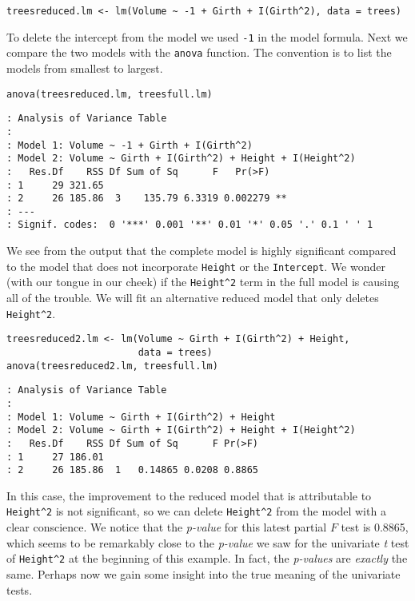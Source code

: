 \begin{verbatim}
treesreduced.lm <- lm(Volume ~ -1 + Girth + I(Girth^2), data = trees)
\end{verbatim}

To delete the intercept from the model we used \texttt{-1} in the model
formula. Next we compare the two models with the \texttt{anova} function. The
convention is to list the models from smallest to largest.

\begin{verbatim}
anova(treesreduced.lm, treesfull.lm)
\end{verbatim}

\begin{verbatim}
: Analysis of Variance Table
: 
: Model 1: Volume ~ -1 + Girth + I(Girth^2)
: Model 2: Volume ~ Girth + I(Girth^2) + Height + I(Height^2)
:   Res.Df    RSS Df Sum of Sq      F   Pr(>F)   
: 1     29 321.65                                
: 2     26 185.86  3    135.79 6.3319 0.002279 **
: ---
: Signif. codes:  0 '***' 0.001 '**' 0.01 '*' 0.05 '.' 0.1 ' ' 1
\end{verbatim}

We see from the output that the complete model is highly significant
compared to the model that does not incorporate \texttt{Height} or the
\texttt{Intercept}. We wonder (with our tongue in our cheek) if the
\texttt{Height\textasciicircum{}2} term in the full model is causing all of the trouble. We
will fit an alternative reduced model that only deletes \texttt{Height\textasciicircum{}2}.

\begin{verbatim}
treesreduced2.lm <- lm(Volume ~ Girth + I(Girth^2) + Height, 
                       data = trees)
anova(treesreduced2.lm, treesfull.lm)
\end{verbatim}

\begin{verbatim}
: Analysis of Variance Table
: 
: Model 1: Volume ~ Girth + I(Girth^2) + Height
: Model 2: Volume ~ Girth + I(Girth^2) + Height + I(Height^2)
:   Res.Df    RSS Df Sum of Sq      F Pr(>F)
: 1     27 186.01                           
: 2     26 185.86  1   0.14865 0.0208 0.8865
\end{verbatim}

In this case, the improvement to the reduced model that is
attributable to \texttt{Height\textasciicircum{}2} is not significant, so we can delete
\texttt{Height\textasciicircum{}2} from the model with a clear conscience. We notice that the
\emph{p-value} for this latest partial \(F\) test is 0.8865, which seems to
be remarkably close to the \emph{p-value} we saw for the univariate \emph{t}
test of \texttt{Height\textasciicircum{}2} at the beginning of this example. In fact, the
\emph{p-values} are \emph{exactly} the same. Perhaps now we gain some insight
into the true meaning of the univariate tests.

